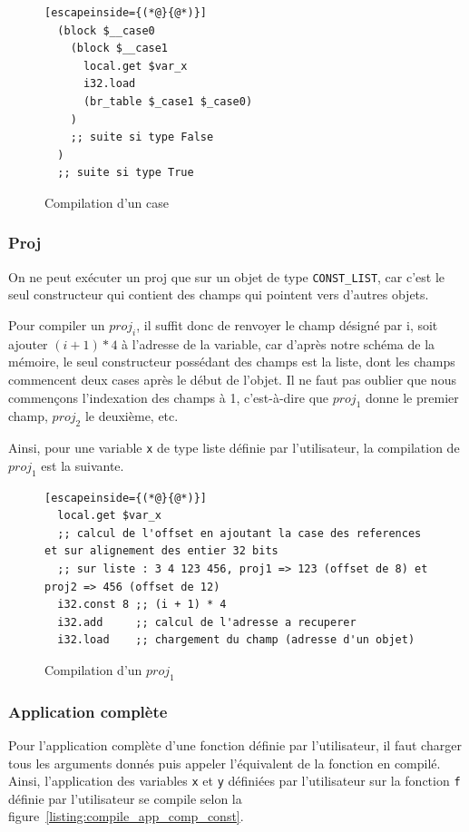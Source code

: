 \documentclass{rapportECL}
\begin{document}
\begin{figure}[H]
	\begin{lstlisting}[escapeinside={(*@}{@*)}]
  (block $__case0
    (block $__case1
      local.get $var_x
      i32.load
      (br_table $_case1 $_case0)
	)
    ;; suite si type False
  )
  ;; suite si type True
	\end{lstlisting}
	\caption{Compilation d'un case}
	\label{listing:compile_case}
\end{figure}

\subsubsection{Proj}

On ne peut exécuter un proj que sur un objet de type \verb|CONST_LIST|, car c'est le seul constructeur qui contient des champs qui
pointent vers d'autres objets.

Pour compiler un $proj_i$, il suffit donc de renvoyer le champ désigné par i, soit ajouter $(i + 1)*4$ à l'adresse de la variable, car
d'après notre schéma de la mémoire, le seul constructeur possédant des champs est la liste, dont les champs commencent deux cases 
après le début de l'objet.
Il ne faut pas oublier que nous commençons l'indexation des champs à 1, c'est-à-dire que $proj_1$ donne le premier champ, 
$proj_2$ le deuxième, etc.

Ainsi, pour une variable \verb|x| de type liste définie par l'utilisateur, la compilation de $proj_1$ est la suivante.
\begin{figure}[H]
	\begin{lstlisting}[escapeinside={(*@}{@*)}]
  local.get $var_x
  ;; calcul de l'offset en ajoutant la case des references et sur alignement des entier 32 bits
  ;; sur liste : 3 4 123 456, proj1 => 123 (offset de 8) et proj2 => 456 (offset de 12)
  i32.const 8 ;; (i + 1) * 4
  i32.add     ;; calcul de l'adresse a recuperer
  i32.load    ;; chargement du champ (adresse d'un objet)
\end{lstlisting}
\caption{Compilation d'un $proj_1$}
\label{listing:compile_proj}
\end{figure}

\subsubsection{Application complète}

Pour l'application complète d'une fonction définie par l'utilisateur, il faut charger tous les arguments donnés puis appeler 
l'équivalent de la fonction en compilé. Ainsi, l'application des variables \verb|x| et \verb|y| définiées par l'utilisateur sur 
la fonction \verb|f| définie par l'utilisateur se compile selon la figure~\ref{listing:compile_app_comp_const}.
\end{document}
